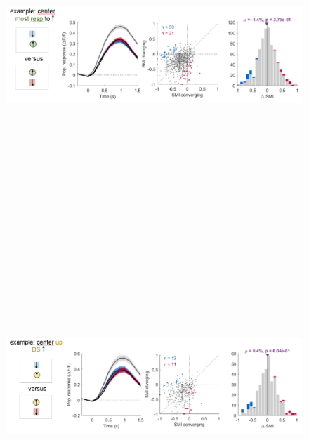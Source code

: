 \begin{figure}[H] \centering \includegraphics[width=12cm,height=12cm,keepaspectratio]{Figures/7.Results/finalPopulation/sel/diagrams/21.png} 
\end{figure}

\begin{figure}[H] \centering \includegraphics[width=12cm,height=12cm,keepaspectratio]{Figures/7.Results/finalPopulation/sel/diagrams/22.png} 
\end{figure}

